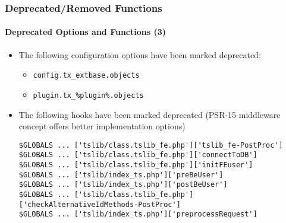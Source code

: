 \begin{frame}[fragile]
	\frametitle{Deprecated/Removed Functions}
	\framesubtitle{Deprecated Options and Functions (3)}

	\lstset{basicstyle=\tiny\ttfamily}

	\begin{itemize}
		\item The following configuration options have been marked deprecated:

			\begin{itemize}
				\item \texttt{config.tx\_extbase.objects}
				\item \texttt{plugin.tx\_\%plugin\%.objects}
			\end{itemize}

		\item The following hooks have been marked deprecated\newline
			\small
				(PSR-15 middleware concept offers better implementation options)
			\normalsize

\begin{lstlisting}
$GLOBALS ... ['tslib/class.tslib_fe.php']['tslib_fe-PostProc']
$GLOBALS ... ['tslib/class.tslib_fe.php']['connectToDB']
$GLOBALS ... ['tslib/class.tslib_fe.php']['initFEuser']
$GLOBALS ... ['tslib/index_ts.php']['preBeUser']
$GLOBALS ... ['tslib/index_ts.php']['postBeUser']
$GLOBALS ... ['tslib/class.tslib_fe.php']['checkAlternativeIdMethods-PostProc']
$GLOBALS ... ['tslib/index_ts.php']['preprocessRequest']
\end{lstlisting}

	\end{itemize}

\end{frame}



